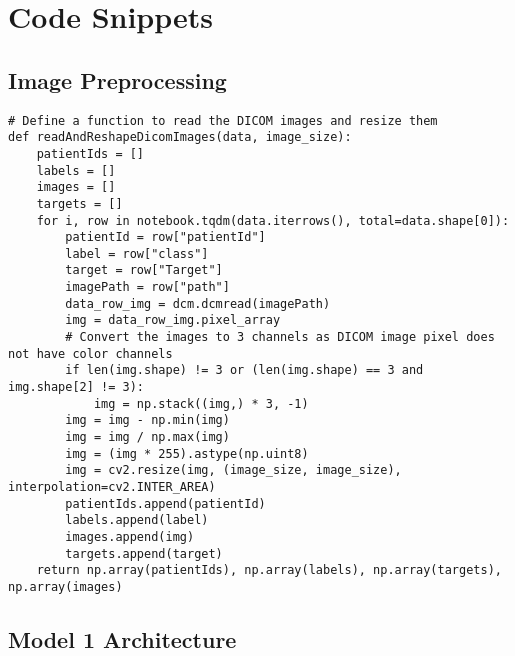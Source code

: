 \appendix
\chapter{Code Snippets}
\label{app:appendix A}

\section{Image Preprocessing}
\label{app:app-A section1}

\begin{verbatim}
# Define a function to read the DICOM images and resize them
def readAndReshapeDicomImages(data, image_size):
    patientIds = []
    labels = []
    images = []
    targets = []
    for i, row in notebook.tqdm(data.iterrows(), total=data.shape[0]):
        patientId = row["patientId"]
        label = row["class"]
        target = row["Target"]
        imagePath = row["path"]
        data_row_img = dcm.dcmread(imagePath)
        img = data_row_img.pixel_array
        # Convert the images to 3 channels as DICOM image pixel does not have color channels
        if len(img.shape) != 3 or (len(img.shape) == 3 and img.shape[2] != 3):
            img = np.stack((img,) * 3, -1)
        img = img - np.min(img)
        img = img / np.max(img)
        img = (img * 255).astype(np.uint8)
        img = cv2.resize(img, (image_size, image_size), interpolation=cv2.INTER_AREA)
        patientIds.append(patientId)
        labels.append(label)
        images.append(img)
        targets.append(target)
    return np.array(patientIds), np.array(labels), np.array(targets), np.array(images)
\end{verbatim}

\section{Model 1 Architecture}
\label{app:app-A section2}

